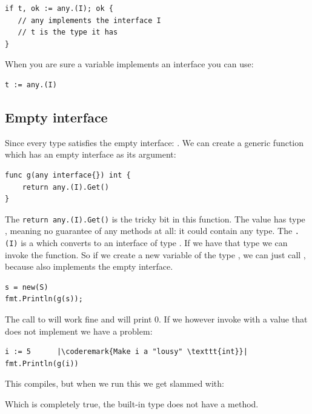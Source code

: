 \begin{lstlisting}
if t, ok := any.(I); ok { 
   // any implements the interface I
   // t is the type it has
} 
\end{lstlisting}
When you are sure a variable implements an interface you can use:
\begin{lstlisting}
t := any.(I)
\end{lstlisting}

\subsection{Empty interface}
Since every type satisfies the empty interface:
. We can create a generic function which 
has an empty interface as its argument:
\begin{lstlisting}[caption=A function with a empty interface argument,label=src:interface empty]
func g(any interface{}) int { 
    return any.(I).Get() 
}
\end{lstlisting}
The \lstinline{return any.(I).Get()} is the tricky bit in this function.
The value  has type , meaning no guarantee
of any methods at all: it could contain any type. The \lstinline{.(I)}
is a  which converts  to an interface of
type . If we have that type we can invoke the 
function.
So if we create a new variable of the type , we can just
call , because  also implements the empty interface.
\begin{lstlisting}
s = new(S)
fmt.Println(g(s));
\end{lstlisting}
The call to  will work fine and will print 0. If we however
invoke  with a value that does not implement  we have
a problem:
\begin{lstlisting}[caption=Failing to implement an interface,label=src:interface fail]
i := 5		|\coderemark{Make i a "lousy" \texttt{int}}|
fmt.Println(g(i))
\end{lstlisting}
This compiles, but when we run this we get slammed with:

\noindent{}

\noindent{}Which is completely true, the built-in type  does not
have a  method.

